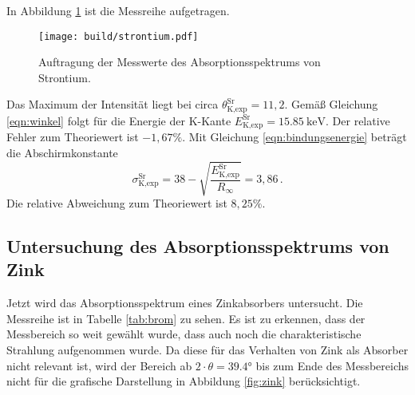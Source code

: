 In Abbildung \ref{fig:strontium} ist die Messreihe aufgetragen.

\begin{figure}
  \centering
  \texttt{[image: build/strontium.pdf]}
  \caption{Auftragung der Messwerte des Absorptionsspektrums von Strontium.}
  \label{fig:strontium}
\end{figure}

Das Maximum der Intensität liegt bei circa $\theta_{\text{K,exp}}^{\text{Sr}} = 11{,}2$.
Gemäß Gleichung \eqref{eqn:winkel} folgt für die Energie der K-Kante $E_{\text{K,exp}}^{\text{Sr}} = \SI{15.85}{\kilo\electronvolt}$.
Der relative Fehler zum Theoriewert ist $-1{,}67\%$. Mit Gleichung \eqref{eqn:bindungsenergie}
beträgt die Abschirmkonstante
\begin{equation*}
  \sigma_{\text{K,exp}}^{\text{Sr}} =  38 - \sqrt{\frac{E_{\text{K,exp}}^{\text{Sr}}}{R_\infty}} = 3{,}86\,.
\end{equation*}
Die relative Abweichung zum Theoriewert ist $8{,}25\%$.

\subsection{Untersuchung des Absorptionsspektrums von Zink}
\label{subsec:zink}

Jetzt wird das Absorptionsspektrum eines Zinkabsorbers untersucht.
Die Messreihe ist in Tabelle \ref{tab:brom} zu sehen. Es ist zu erkennen, dass
der Messbereich so weit gewählt wurde, dass auch noch die charakteristische
Strahlung aufgenommen wurde. Da diese für das Verhalten von Zink als Absorber nicht
relevant ist, wird der Bereich ab $2 \cdot \theta = 39.4°$ bis zum Ende des Messbereichs
nicht für die grafische Darstellung in Abbildung \ref{fig:zink} berücksichtigt.

